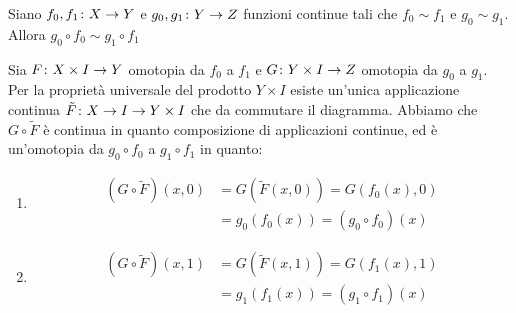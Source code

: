 \documentclass[a4paper]{article}
\begin{document}
\begin{snippetlemma}{}
    Siano \(f_0, f_1 \colon X \to Y\) e \(g_0, g_1 \colon Y \to Z\)
    funzioni continue tali che \(f_0 \sim f_1\) e \(g_0 \sim g_1\).
    Allora \(g_0 \circ f_0 \sim g_1 \circ f_1\)
\end{snippetlemma}

\begin{center}
\end{center}

\begin{snippetproof}{}
    Sia \(F \colon X \times I \to Y\)
    omotopia da \(f_0\) a \(f_1\)
    e \(G \colon Y \times I \to Z\)
    omotopia da \(g_0\) a \(g_1\).
    Per la proprietà universale del prodotto
    \(Y \times I\) esiste un'unica applicazione continua
    \(\tilde F \colon X \to I \to Y \times I\)
    che da commutare il diagramma.
    Abbiamo che \(G \circ \tilde F\) è continua in quanto
    composizione di applicazioni continue,
    ed è un'omotopia da \(g_0 \circ f_0\)
    a \(g_1 \circ f_1\) in quanto:
    \begin{enumerate}
        \item \begin{align*}
            (G \circ \tilde F)(x,0)
            &= G(\tilde F(x,0)) =
            G(f_0(x), 0) \\
            &= g_0(f_0(x)) = (g_0 \circ f_0)(x)
        \end{align*}
        \item \begin{align*}
            (G \circ \tilde F)(x,1)
            &= G(\tilde F(x,1)) =
            G(f_1(x), 1) \\
            &= g_1(f_1(x)) = (g_1 \circ f_1)(x)
        \end{align*}
    \end{enumerate}
\end{snippetproof}
\end{document}

